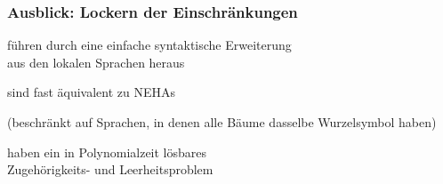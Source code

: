     \begin{frame}
      \frametitle{Ausblick: Lockern der Einschränkungen}
      
      \begin{Itemize}
        \item
          führen durch eine einfache syntaktische Erweiterung\\
          aus den lokalen Sprachen heraus
        \item
          sind fast äquivalent zu NEHAs
          \par\smallskip
          {\small (beschränkt auf Sprachen, in denen alle Bäume dasselbe Wurzelsymbol haben)}
        \item
          haben ein in Polynomialzeit lösbares\\
          Zugehörigkeits- und Leerheitsproblem
      \end{Itemize}

      \par\bigskip


    \end{frame}


% 


  \AtBeginSection{\relax}
  \section*{}

